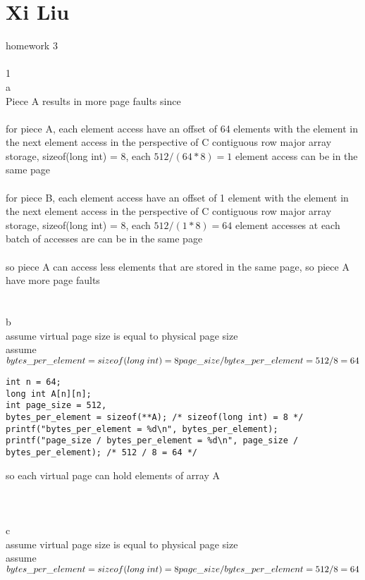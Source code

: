 \documentclass[12pt, border = 4pt, multi]{article} %
\begin{document}
\section*{Xi Liu}
homework 3\\
\\
1\\
a\\
Piece A results in more page faults since\\
\\
for piece A, each element access have an offset of 64 elements with the element in the next element access in the perspective of C contiguous row major array storage, sizeof(long int) = 8, each $512 / (64 * 8) = 1$ element access can be in the same page\\
\\
for piece B, each element access have an offset of 1 element with the element in the next element access in the perspective of C contiguous row major array storage, sizeof(long int) = 8, each $512 / (1 * 8) = 64$ element accesses at each batch of accesses are can be in the same page\\
\\
so piece A can access less elements that are stored in the same page, so piece A have more page faults\\
\\
\\
b\\
assume virtual page size is equal to physical page size\\
assume $bytes\_per\_element = sizeof(long\;int) = 8\\
page\_size / bytes\_per\_element = 512 / 8 = 64$
\begin{lstlisting}
int n = 64;
long int A[n][n];
int page_size = 512,
bytes_per_element = sizeof(**A); /* sizeof(long int) = 8 */
printf("bytes_per_element = %d\n", bytes_per_element);
printf("page_size / bytes_per_element = %d\n", page_size / bytes_per_element); /* 512 / 8 = 64 */
\end{lstlisting}
so each virtual page can hold  elements of array A\\
\\
\\
\\
c\\
assume virtual page size is equal to physical page size\\
assume $bytes\_per\_element = sizeof(long\;int) = 8\\
page\_size / bytes\_per\_element = 512 / 8 = 64$
\end{document}
